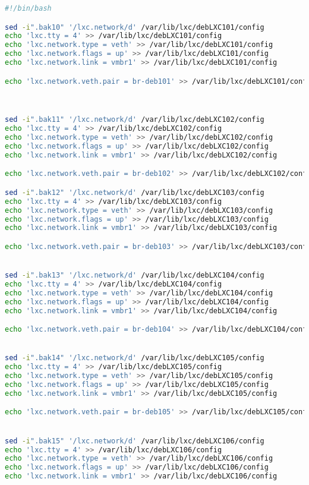 \documentclass[french]{article}
\begin{document}
\begin{lstlisting}[language=bash,caption={}]
#!/bin/bash

sed -i".bak10" '/lxc.network/d' /var/lib/lxc/debLXC101/config
echo 'lxc.tty = 4' >> /var/lib/lxc/debLXC101/config
echo 'lxc.network.type = veth' >> /var/lib/lxc/debLXC101/config
echo 'lxc.network.flags = up' >> /var/lib/lxc/debLXC101/config
echo 'lxc.network.link = vmbr1' >> /var/lib/lxc/debLXC101/config

echo 'lxc.network.veth.pair = br-deb101' >> /var/lib/lxc/debLXC101/config



sed -i".bak11" '/lxc.network/d' /var/lib/lxc/debLXC102/config
echo 'lxc.tty = 4' >> /var/lib/lxc/debLXC102/config
echo 'lxc.network.type = veth' >> /var/lib/lxc/debLXC102/config
echo 'lxc.network.flags = up' >> /var/lib/lxc/debLXC102/config
echo 'lxc.network.link = vmbr1' >> /var/lib/lxc/debLXC102/config

echo 'lxc.network.veth.pair = br-deb102' >> /var/lib/lxc/debLXC102/config

sed -i".bak12" '/lxc.network/d' /var/lib/lxc/debLXC103/config
echo 'lxc.tty = 4' >> /var/lib/lxc/debLXC103/config
echo 'lxc.network.type = veth' >> /var/lib/lxc/debLXC103/config
echo 'lxc.network.flags = up' >> /var/lib/lxc/debLXC103/config
echo 'lxc.network.link = vmbr1' >> /var/lib/lxc/debLXC103/config

echo 'lxc.network.veth.pair = br-deb103' >> /var/lib/lxc/debLXC103/config


sed -i".bak13" '/lxc.network/d' /var/lib/lxc/debLXC104/config
echo 'lxc.tty = 4' >> /var/lib/lxc/debLXC104/config
echo 'lxc.network.type = veth' >> /var/lib/lxc/debLXC104/config
echo 'lxc.network.flags = up' >> /var/lib/lxc/debLXC104/config
echo 'lxc.network.link = vmbr1' >> /var/lib/lxc/debLXC104/config

echo 'lxc.network.veth.pair = br-deb104' >> /var/lib/lxc/debLXC104/config


sed -i".bak14" '/lxc.network/d' /var/lib/lxc/debLXC105/config
echo 'lxc.tty = 4' >> /var/lib/lxc/debLXC105/config
echo 'lxc.network.type = veth' >> /var/lib/lxc/debLXC105/config
echo 'lxc.network.flags = up' >> /var/lib/lxc/debLXC105/config
echo 'lxc.network.link = vmbr1' >> /var/lib/lxc/debLXC105/config

echo 'lxc.network.veth.pair = br-deb105' >> /var/lib/lxc/debLXC105/config


sed -i".bak15" '/lxc.network/d' /var/lib/lxc/debLXC106/config
echo 'lxc.tty = 4' >> /var/lib/lxc/debLXC106/config
echo 'lxc.network.type = veth' >> /var/lib/lxc/debLXC106/config
echo 'lxc.network.flags = up' >> /var/lib/lxc/debLXC106/config
echo 'lxc.network.link = vmbr1' >> /var/lib/lxc/debLXC106/config


\end{lstlisting}
\end{document}
